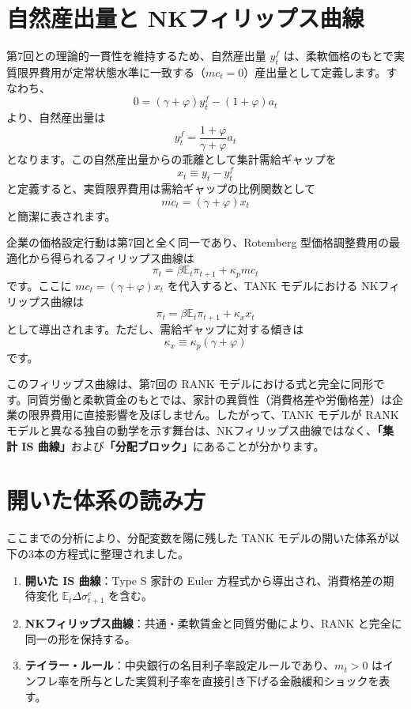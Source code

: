 \documentclass[
  japanese,
  lualatex,
  ja=standard,
  12pt,
  a4paper]{ltjsarticle}
\providecommand{\tightlist}{%
  \setlength{\itemsep}{0pt}\setlength{\parskip}{0pt}}
\begin{document}
\section{自然産出量と
NKフィリップス曲線}\label{ux81eaux7136ux7523ux51faux91cfux3068-nkux30d5ux30a3ux30eaux30c3ux30d7ux30b9ux66f2ux7dda}

第7回との理論的一貫性を維持するため、自然産出量 \(y_t^f\)
は、柔軟価格のもとで実質限界費用が定常状態水準に一致する（\(mc_t=0\)）産出量として定義します。すなわち、
\[
0 = (\gamma+\varphi) y_t^f - (1+\varphi) a_t
\] より、自然産出量は \[
y_t^f = \frac{1+\varphi}{\gamma+\varphi} a_t
\] となります。この自然産出量からの乖離として集計需給ギャップを \[
x_t \equiv y_t - y_t^f
\] と定義すると、実質限界費用は需給ギャップの比例関数として \[
mc_t = (\gamma+\varphi) x_t
\] と簡潔に表されます。


企業の価格設定行動は第7回と全く同一であり、Rotemberg
型価格調整費用の最適化から得られるフィリップス曲線は \[
\pi_t = \beta \mathbb{E}_t \pi_{t+1} + \kappa_p mc_t
\] です。ここに \(mc_t = (\gamma+\varphi) x_t\) を代入すると、TANK
モデルにおける NKフィリップス曲線は \[
\pi_t = \beta \mathbb{E}_t \pi_{t+1} + \kappa_x x_t
\] として導出されます。ただし、需給ギャップに対する傾きは \[
\kappa_x \equiv \kappa_p (\gamma+\varphi)
\] です。

このフィリップス曲線は、第7回の RANK
モデルにおける式と完全に同形です。同質労働と柔軟賃金のもとでは、家計の異質性（消費格差や労働格差）は企業の限界費用に直接影響を及ぼしません。したがって、TANK
モデルが RANK
モデルと異なる独自の動学を示す舞台は、NKフィリップス曲線ではなく、\textbf{「集計
IS 曲線」}および\textbf{「分配ブロック」}にあることが分かります。

\section{開いた体系の読み方}\label{ux958bux3044ux305fux4f53ux7cfbux306eux8aadux307fux65b9}

ここまでの分析により、分配変数を陽に残した TANK
モデルの開いた体系が以下の3本の方程式に整理されました。

\begin{enumerate}
\def\labelenumi{\arabic{enumi}.}
\tightlist
\item
  \textbf{開いた IS 曲線}：Type S 家計の Euler
  方程式から導出され、消費格差の期待変化
  \(\mathbb{E}_t \Delta \sigma_{t+1}^c\) を含む。
\item
  \textbf{NKフィリップス曲線}：共通・柔軟賃金と同質労働により、RANK
  と完全に同一の形を保持する。
\item
  \textbf{テイラー・ルール}：中央銀行の名目利子率設定ルールであり、\(m_t>0\)
  はインフレ率を所与とした実質利子率を直接引き下げる金融緩和ショックを表す。
\end{enumerate}
\end{document}
